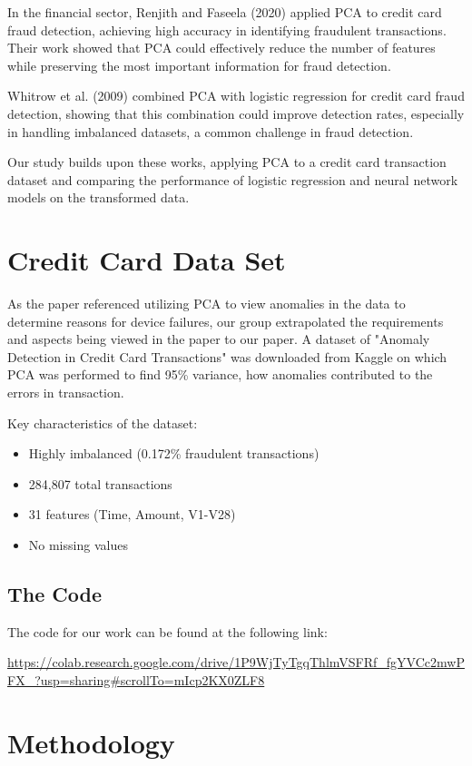\documentclass{article}
\begin{document}
In the financial sector, Renjith and Faseela (2020) applied PCA to credit card fraud detection, achieving high accuracy in identifying fraudulent transactions. Their work showed that PCA could effectively reduce the number of features while preserving the most important information for fraud detection.

Whitrow et al. (2009) combined PCA with logistic regression for credit card fraud detection, showing that this combination could improve detection rates, especially in handling imbalanced datasets, a common challenge in fraud detection.

Our study builds upon these works, applying PCA to a credit card transaction dataset and comparing the performance of logistic regression and neural network models on the transformed data.

\section{Credit Card Data Set}
As the paper referenced utilizing PCA to view anomalies in the data to determine reasons for device failures, our group extrapolated the requirements and aspects being viewed in the paper to our paper. A dataset of "Anomaly Detection in Credit Card Transactions" was downloaded from Kaggle on which PCA was performed to find 95\% variance, how anomalies contributed to the errors in transaction.

Key characteristics of the dataset:
\begin{itemize}
    \item Highly imbalanced (0.172\% fraudulent transactions)
    \item 284,807 total transactions
    \item 31 features (Time, Amount, V1-V28)
    \item No missing values
\end{itemize}

\subsection{The Code}
The code for our work can be found at the following link:

\url{https://colab.research.google.com/drive/1P9WjTyTgqThlmVSFRf_fgYVCc2mwPFX_?usp=sharing#scrollTo=mIcp2KX0ZLF8}

\section{Methodology}
\end{document}
